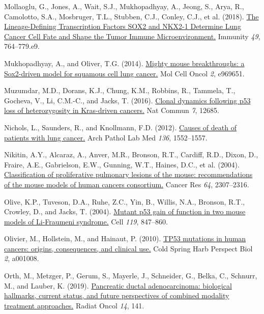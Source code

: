 \begin{CSLReferences}{0}{0}
\leavevmode{}%
Mollaoglu, G., Jones, A., Wait, S.J., Mukhopadhyay, A., Jeong, S., Arya, R., Camolotto, S.A., Mosbruger, T.L., Stubben, C.J., Conley, C.J., et al. (2018). \href{https://doi.org/10.1016/j.immuni.2018.09.020}{The Lineage-Defining Transcription Factors SOX2 and NKX2-1 Determine Lung Cancer Cell Fate and Shape the Tumor Immune Microenvironment.} Immunity \emph{49}, 764--779.e9.

\leavevmode{}%
Mukhopadhyay, A., and Oliver, T.G. (2014). \href{https://doi.org/10.4161/23723548.2014.969651}{Mighty mouse breakthroughs: a Sox2-driven model for squamous cell lung cancer.} Mol Cell Oncol \emph{2}, e969651.

\leavevmode{}%
Muzumdar, M.D., Dorans, K.J., Chung, K.M., Robbins, R., Tammela, T., Gocheva, V., Li, C.M.-C., and Jacks, T. (2016). \href{https://doi.org/10.1038/ncomms12685}{Clonal dynamics following p53 loss of heterozygosity in Kras-driven cancers.} Nat Commun \emph{7}, 12685.

\leavevmode{}%
Nichols, L., Saunders, R., and Knollmann, F.D. (2012). \href{https://doi.org/10.5858/arpa.2011-0521-oa}{Causes of death of patients with lung cancer.} Arch Pathol Lab Med \emph{136}, 1552--1557.

\leavevmode{}%
Nikitin, A.Y., Alcaraz, A., Anver, M.R., Bronson, R.T., Cardiff, R.D., Dixon, D., Fraire, A.E., Gabrielson, E.W., Gunning, W.T., Haines, D.C., et al. (2004). \href{https://doi.org/10.1158/0008-5472.can-03-3376}{Classification of proliferative pulmonary lesions of the mouse: recommendations of the mouse models of human cancers consortium.} Cancer Res \emph{64}, 2307--2316.

\leavevmode{}%
Olive, K.P., Tuveson, D.A., Ruhe, Z.C., Yin, B., Willis, N.A., Bronson, R.T., Crowley, D., and Jacks, T. (2004). \href{https://doi.org/10.1016/j.cell.2004.11.004}{Mutant p53 gain of function in two mouse models of Li-Fraumeni syndrome.} Cell \emph{119}, 847--860.

\leavevmode{}%
Olivier, M., Hollstein, M., and Hainaut, P. (2010). \href{https://doi.org/10.1101/cshperspect.a001008}{TP53 mutations in human cancers: origins, consequences, and clinical use.} Cold Spring Harb Perspect Biol \emph{2}, a001008.

\leavevmode{}%
Orth, M., Metzger, P., Gerum, S., Mayerle, J., Schneider, G., Belka, C., Schnurr, M., and Lauber, K. (2019). \href{https://doi.org/10.1186/s13014-019-1345-6}{Pancreatic ductal adenocarcinoma: biological hallmarks, current status, and future perspectives of combined modality treatment approaches.} Radiat Oncol \emph{14}, 141.


\end{CSLReferences}
